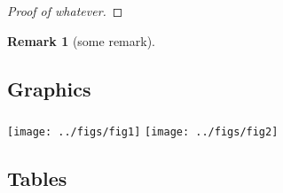 \documentclass[%
]{phdpresentation}
\newtheorem*{remark}{Remark}
\begin{document}
\begin{frame}
	\frametitle{\secname}
	\framesubtitle{\subsecname}
	\begin{twocolumns}
		\begin{onecolumn}
			\begin{theorem}
				\blindtextshortshortmath
			\end{theorem}
			\begin{lemma}
				\blindtextshortshortmath
			\end{lemma}
			\begin{proof}[Proof of whatever]
				\blindtextshortshortmath
			\end{proof}
		\end{onecolumn}
		\begin{onecolumn}
			\begin{definition}
				\blindtextshortshortmath
			\end{definition}
			\begin{corollary}
				\blindtextshortshortmath
			\end{corollary}
			\begin{remark}[some remark]
				\blindtextshortshortmath
			\end{remark}
		\end{onecolumn}
	\end{twocolumns}
\end{frame}

\subsection{Graphics}
\begin{frame}
	\frametitle{\secname}
	\framesubtitle{\subsecname}
	\blindtextshort
	\par
	\vspace{1em}
	\texttt{[image: ../figs/fig1]}
	\hfill
	\texttt{[image: ../figs/fig2]}
	\par
	\vspace{1em}
	\blindtextshortshort
\end{frame}

\subsection{Tables}
\begin{frame}
	\frametitle{\secname}
	\framesubtitle{\subsecname}
	\blindtextshort
	\par
	\vspace{1em}
	\centering
	\blindtabular
\end{frame}
\end{document}
